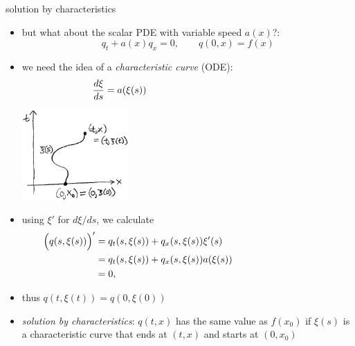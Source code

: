\documentclass[10pt,hyperref]{beamer}
\newcommand{\ds}{\displaystyle}
\begin{document}
\begin{frame}{solution by characteristics}

\begin{itemize}
\item but what about the scalar PDE with variable speed $a(x)$?:
    $$q_t + a(x) q_x=0, \qquad q(0,x) = f(x)$$
\item we need the idea of a \emph{characteristic curve} (ODE):
    $$\ds \frac{d\xi}{ds} = a(\xi(s)) \hspace{50mm}$$

\vspace{-10mm}

\hfill \includegraphics[width=0.32\textwidth]{figs/characteristicsketch}

\vspace{-20mm}
\item using $\xi'$ for $d\xi/ds$, we calculate
\begin{align*}
\Big(q(s,\xi(s))\Big)' &= q_t(s,\xi(s)) + q_x(s,\xi(s)) \xi'(s) \hspace{40mm} \\
                          &= q_t(s,\xi(s)) + q_x(s,\xi(s)) a(\xi(s)) \\
                          &= 0,
\end{align*}
\item thus $q(t,\xi(t)) = q(0,\xi(0))$
\item \emph{solution by characteristics}: $q(t,x)$ has the same value as $f(x_0)$ if $\xi(s)$ is a characteristic curve that ends at $(t,x)$ and starts at $(0,x_0)$
\end{itemize}
\end{frame}
\end{document}
